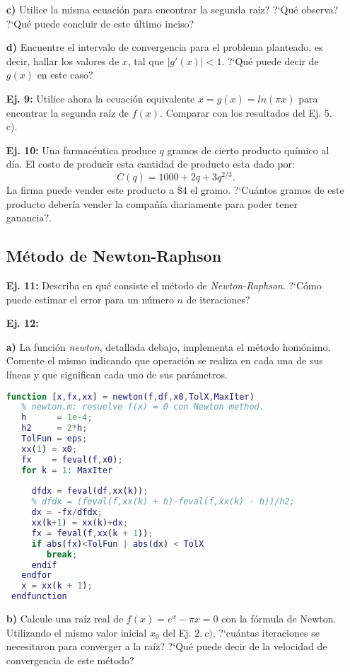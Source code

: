 \documentclass[11pt]{article}
\begin{document}
\begin{itemize}
\item[{\bf c)}] Utilice la misma ecuaci\'on para encontrar la segunda ra\'iz? ?`Qu\'e observa? ?`Qu\'e puede concluir de este \'ultimo inciso?

\item[{\bf d)}] Encuentre el intervalo de convergencia para el problema planteado, es decir, hallar los valores de $x$, tal que $|g'(x)|<1$. ?`Qu\'e puede decir de $g(x)$ en este caso?

\item[{\bf Ej. 9:}] Utilice ahora la ecuaci\'on equivalente $x=g(x)=ln(\pi x)$ para encontrar la segunda ra\'iz de $f(x)$. Comparar con los resultados del Ej. 5. c). 

\item[{\bf Ej. 10:}] Una farmac\'eutica produce $q$ gramos de cierto producto qu\'imico al d\'ia. El costo de producir esta cantidad de producto esta dado por:
\begin{equation}
 C(q)=1000+2q+3q^{2/3}.
\end{equation} 
La firma puede vender este producto a $\$4$ el gramo. ?`Cu\'antos gramos de este producto deber\'ia vender la compa\~n\'ia diariamente para poder tener ganancia?.

\subsection *{M\'etodo de Newton-Raphson}

\item[{\bf Ej. 11:}] Describa en qu\'e consiste el m\'etodo de \textit{Newton-Raphson}. ?`C\'omo puede estimar el error para un n\'umero $n$ de iteraciones?

\item[{\bf Ej. 12:}]

\item[{\bf a)}] La funci\'on \textit{newton}, detallada debajo, implementa el m\'etodo hom\'onimo. Comente el mismo indicando que operaci\'on se realiza en cada una de sus l\'ineas y que significan cada uno de sus par\'ametros.
\begin{lstlisting}[language=matlab]
 function [x,fx,xx] = newton(f,df,x0,TolX,MaxIter)
   % newton.m: resuelve f(x) = 0 con Newton method.
   h      = 1e-4;
   h2     = 2*h;
   TolFun = eps;
   xx(1) = x0;
   fx    = feval(f,x0);
   for k = 1: MaxIter
      
     dfdx = feval(df,xx(k)); 
     % dfdx = (feval(f,xx(k) + h)-feval(f,xx(k) - h))/h2; 
     dx = -fx/dfdx;
     xx(k+1) = xx(k)+dx;
     fx = feval(f,xx(k + 1));
     if abs(fx)<TolFun | abs(dx) < TolX
        break;
     endif
   endfor
   x = xx(k + 1);
 endfunction
\end{lstlisting}
\item[{\bf b)}] Calcule una ra\'iz real de $f(x) = e^x - \pi x = 0$ con la f\'ormula de Newton. Utilizando el mismo valor inicial $x_0$ del Ej. $2.~c)$, ?`cu\'antas iteraciones se necesitaron para converger a la ra\'iz? ?`Qu\'e puede decir de la velocidad de convergencia de este m\'etodo?


\end{itemize}
\end{document}
